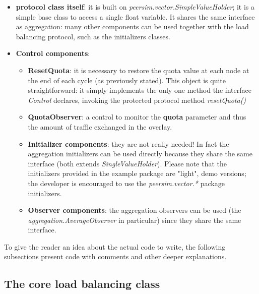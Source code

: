 \documentclass[a4paper,11pt]{article}
\begin{document}
\begin{itemize}
\item \textbf{protocol class itself}: it is built on
  \emph{peersim.vector.SimpleValueHolder}; it is a simple base class
  to access a single float variable. It shares the same interface as
  aggregation: many other components can be used together with the
  load balancing protocol, such as the initializers classes. 

\item \textbf{Control components}: 

\begin{itemize}

\item \textbf{ResetQuota}: it is necessary to restore the quota value
  at each node at the end of each cycle (as previously stated). This
  object is quite straightforward: it simply implements the only one
  method the interface \emph{Control} declares, invoking the protected
  protocol method \emph{resetQuota()}

\item \textbf{QuotaObserver}: a control to monitor the \textbf{quota}
  parameter and thus the amount of traffic exchanged in the overlay. 

\item \textbf{Initializer components}: they are not really needed!
 In fact the aggregation initializers can be used directly because they
 share the same interface (both extends \emph{SingleValueHolder}).
Please note that the initializers provided in the example package are
"light", demo versions; the developer is encouraged to use the
\emph{peersim.vector.*} package initializers. 

\item \textbf{Observer components}: the aggregation observers can be
  used (the \emph{aggregation.AverageObserver} in particular) since
  they share the same interface.

\end{itemize}

\end{itemize}
To give the reader an idea about the actual code to write, the following
subsections present code with comments and other deeper explanations.

\subsection{The core load balancing class}
\end{document}
